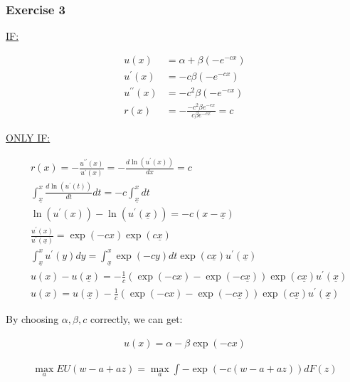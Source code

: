 {
\subsubsection*{Exercise 3}

\begin{enumerate}[label=(\alph*)]
{\item
\underline{IF:}

\begin{align*}
    u(x) &= \alpha + \beta \left( -e^{-cx} \right) \\
    u^\prime(x) &= -c\beta \left( -e^{-cx} \right) \\
    u^{\prime\prime}(x) &= -c^2\beta \left( -e^{-cx} \right) \\
    r(x) &= -\frac{-c^2 \beta e^{-c x}}{c \beta e^{-c x}}=c
\end{align*}

\underline{ONLY IF:}

\begin{align*}
    & r(x)=-\frac{u^{\prime \prime}(x)}{u^{\prime}(x)}=-\frac{d \ln \left(u^{\prime}(x)\right)}{d x}=c \\
    & \int_{\underline{x}}^x \frac{d \ln\left(u^{\prime}(t)\right)}{d t} d t=-c \int_{\underline{x}}^x d t \\
    & \ln \left(u^{\prime}(x)\right)-\ln \left(u^{\prime}(\underline{x})\right)=-c(x-\underline{x}) \\
    & \frac{u^{\prime}(x)}{u^{\prime}(\underline{x})}=\exp (-c x) \exp (c \underline{x}) \\
    & \int_{\underline{x}}^x u^\prime(y) dy = \int_{\underline{x}}^x \exp (-c y) d t \exp (c \underline{x}) u^{\prime}(\underline{x}) \\
    & u(x)-u(\underline{x})=-\frac{1}{c}(\exp (-c x)-\exp (-c \underline{x})) \exp (c \underline{x}) u^{\prime}(\underline{x}) \\
    & u(x)=u(\underline{x})-\frac{1}{c}(\exp (-c x)-\exp (-c \underline{x})) \exp (c \underline{x}) u^{\prime}(\underline{x})
\end{align*}

By choosing $\alpha, \beta, c$ correctly, we can get:

\begin{align*}
    u(x)=\alpha-\beta \exp (-c x)
\end{align*}
}
{\item 
\begin{align*}
    \max _a E U(w-a+a z) = 
    \max _a \int-\exp (-c(w-a+a z)) d F(z)
\end{align*}

}
\end{enumerate}}

